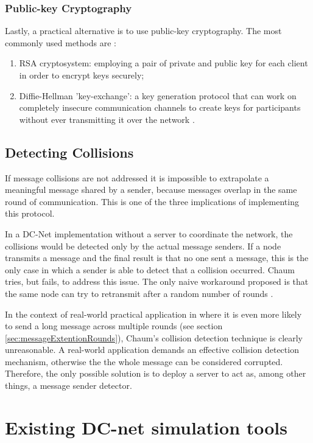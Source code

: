 \subsubsection{Public-key Cryptography}
Lastly, a practical alternative is to use public-key cryptography. The most commonly used methods are \cite{Chaum}:
\begin{enumerate}
    \item RSA cryptosystem: employing a pair of private and public key for each client in order to encrypt keys securely;
    \item Diffie-Hellman 'key-exchange': a key generation protocol that can work on completely insecure communication channels to create keys for participants without ever transmitting it over the network \cite{Golle}.
\end{enumerate}


\subsection{Detecting Collisions} \label{sec:detectCollisions}
If message collisions are not addressed it is impossible to extrapolate a meaningful message shared by a sender, because messages overlap in the same round of communication. This is one of the three implications of implementing this protocol. \newline

In a DC-Net implementation without a server to coordinate the network, the collisions would be detected only by the actual message senders. If a node transmits a message and the final result is that no one sent a message, this is the only case in which a sender is able to detect that a collision occurred. Chaum tries, but fails, to address this issue. The only naive workaround proposed is that the same node can try to retransmit after a random number of rounds \cite{Chaum}. \newline


In the context of real-world practical application in where it is even more likely to send a long message across multiple rounds (see section \ref{sec:messageExtentionRounds}), Chaum's collision detection technique is clearly unreasonable. 
A real-world application demands an effective collision detection mechanism, otherwise the the whole message can be considered corrupted. Therefore, the only possible solution is to deploy a server to act as, among other things, a message sender detector.


\section{Existing DC-net simulation tools} \label{sec:similarWorks}

